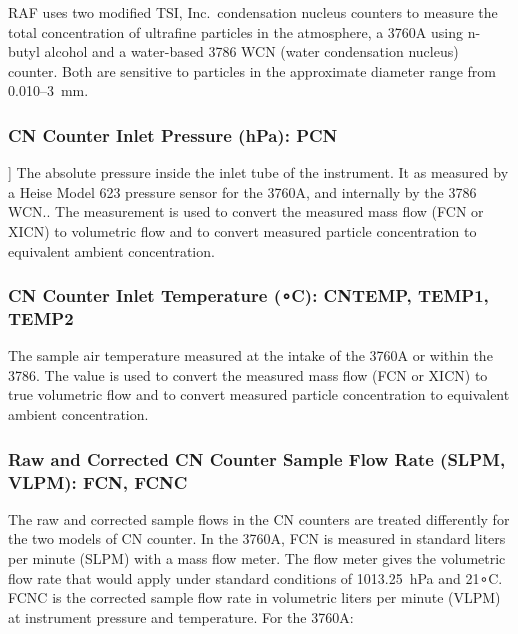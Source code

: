 \documentclass[
  english,
]{book}
\newcommand{\textgreek}[2][]{\foreignlanguage{greek}{#2}}
\begin{document}
RAF uses two modified TSI, Inc.~condensation nucleus counters to measure
the total concentration of ultrafine particles in the atmosphere, a
3760A using n-butyl alcohol and a water-based 3786 WCN (water
condensation nucleus) counter. Both are sensitive to particles in the
approximate diameter range from 0.010--3~\textgreek{m}m.

\hypertarget{pcn}{%
\subsubsection*{CN Counter Inlet Pressure (hPa): PCN}\label{pcn}}

{]} The absolute pressure inside the inlet tube of the instrument. It as
measured by a Heise Model 623 pressure sensor for the 3760A, and
internally by the 3786 WCN.. The measurement is used to convert the
measured mass flow (FCN or XICN) to volumetric flow and to convert
measured particle concentration to equivalent ambient concentration.

\hypertarget{cntemp}{%
\subsubsection*{\texorpdfstring{CN Counter Inlet Temperature ({∘}C):
CNTEMP, TEMP1,
TEMP2}{CN Counter Inlet Temperature (∘C): CNTEMP, TEMP1, TEMP2}}\label{cntemp}}

The sample air temperature measured at the intake of the 3760A or within
the 3786. The value is used to convert the measured mass flow (FCN or
XICN) to true volumetric flow and to convert measured particle
concentration to equivalent ambient concentration.

\hypertarget{fcnc}{%
\subsubsection*{Raw and Corrected CN Counter Sample Flow Rate (SLPM,
VLPM): FCN, FCNC}\label{fcnc}}

The raw and corrected sample flows in the CN counters are treated
differently for the two models of CN counter. In the 3760A, FCN is
measured in standard liters per minute (SLPM) with a mass flow meter.
The flow meter gives the volumetric flow rate that would apply under
standard conditions of 1013.25~hPa and 21{∘}C. FCNC is the corrected
sample flow rate in volumetric liters per minute (VLPM) at instrument
pressure and temperature. For the 3760A:
\end{document}
